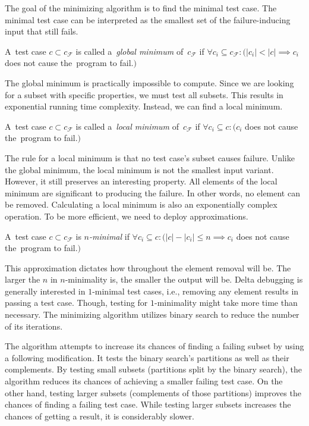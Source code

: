 The goal of the minimizing algorithm is to find the minimal test case. 
The minimal test case can be interpreted as the smallest set of 
the failure-inducing input that still fails.

\begin{defn}\label{def02:2}
  A~test case $c \subset c_\mathcal{F}$ is called a~\emph{global minimum}
  of~$c_\mathcal{F}$ if $\forall c_i \subseteq c_\mathcal{F}:
  (|c_i| < |c| \implies c_i$ does not cause the~program to fail.$)$
\end{defn}

The global minimum is practically impossible to compute. 
Since we are looking for a subset with specific properties, we must test 
all subsets. 
This results in exponential running time complexity. 
Instead, we can find a local minimum.

\begin{defn}\label{def02:3}
  A~test case $c \subset c_\mathcal{F}$ is called a~\emph{local minimum}
  of~$c_\mathcal{F}$ if $\forall c_i \subseteq c:
  (c_i$ does not cause the~program to fail.$)$
\end{defn}

The rule for a local minimum is that no test case's subset causes failure. 
Unlike the global minimum, the local minimum is not the smallest input 
variant. 
However, it still preserves an interesting property. 
All elements of the local minimum are significant to producing the failure. 
In other words, no element can be removed.
Calculating a local minimum is also an exponentially complex operation. 
To be more efficient, we need to deploy approximations. 

\begin{defn}[$n$-minimality]\label{def02:4}
  A~test case $c \subset c_\mathcal{F}$ is \emph{$n$-minimal}
  if $\forall c_i \subseteq c:
  (|c| - |c_i| \leq n \implies c_i$ does not cause the~program to fail.$)$
\end{defn}

This approximation dictates how throughout the element removal will be. 
The larger the $n$ in $n$-minimality is, the smaller the output will be. 
Delta debugging is generally interested in $1$-minimal test cases, i.e., 
removing any element results in passing a test case. 
Though, testing for $1$-minimality might take more time than necessary.
The minimizing algorithm utilizes binary search to reduce the number of its 
iterations.

The algorithm attempts to increase its chances of finding a failing subset
by using a following modification. It tests the binary search's partitions 
as well as their complements. By testing small subsets (partitions split by
the binary search), the algorithm reduces its chances of achieving a smaller
failing test case. On the other hand, testing larger subsets (complements
of those partitions) improves the chances of finding a failing test case.
While testing larger subsets increases the chances of getting a result, it
is considerably slower.

